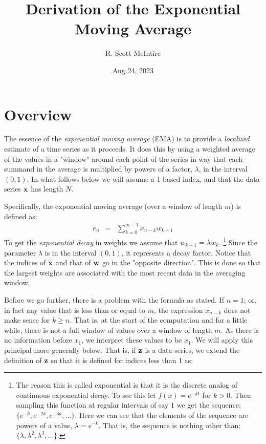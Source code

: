 \documentclass{article}
\title{Derivation of the Exponential Moving Average}
\author{R. Scott McIntire}
\date{Aug 24, 2023}
\begin{document}
\maketitle


\section{Overview}

The essence of the {\em exponential moving average\/} (EMA) is to provide 
a {\em localized\/} estimate of a time series as it proceeds. It does 
this by using a weighted average of the values in a "window" around each point 
of the series in way that each summand in 
the average is multiplied by powers of a factor, $\lambda$,
in the interval $(0,1)$.
In what follows below we will assume a 1-based index, and that 
the data series ${\bf x}$ has length $N$.

Specifically, the exponential moving average (over a window of length $m$) 
is defined as:
\begin{eqnarray}
    e_n & = & \sum_{k=0}^{m-1} x_{n-k} w_{k+1} \label{ema_def}
\end{eqnarray}
To get the {\em exponential decay\/} in weights we assume that $w_{k+1} = \lambda w_k$.%
\footnote{The reason this is called exponential is that it is the discrete
analog of continuous exponential decay. To see this let $f(x) = e^{-kt}$ 
for $k > 0$. Then sampling this function at regular intervals of say $1$ 
we get the sequence: $\{ e^{-k}, e^{-2k}, e^{-3k}, \ldots \}$.
Here we can see that the elements of the sequence are powers of a value, $\lambda = e^{-k}$.
That is, the sequence is nothing other than: $\{\lambda, \lambda^2, \lambda^3, \ldots \}$.}
Since the parameter $\lambda$ is in the interval $(0,1)$, it represents a decay factor. 
Notice that the indices of ${\bf x}$ and that of ${\bf w}$ go in the "opposite direction".
This is done so that the largest weights are associated with the most recent data
in the averaging window.

Before we go further, there is a problem with the formula as stated.
If $n = 1$; or, in fact any value that is less than or equal to $m$,
the expression $x_{n-k}$ does not make sense for $k \ge n$. That is, at the 
start of the computation and for a little while, there is not a full window
of values over a window of length $m$. As there is no information before $x_1$,
we interpret these values to be $x_1$. 
We will apply this principal more generally below. 
That is, if ${\bf z}$ is a data series,
we extend the definition of ${\bf z}$ so that it is defined for
indices less than 1 as:
\end{document}
